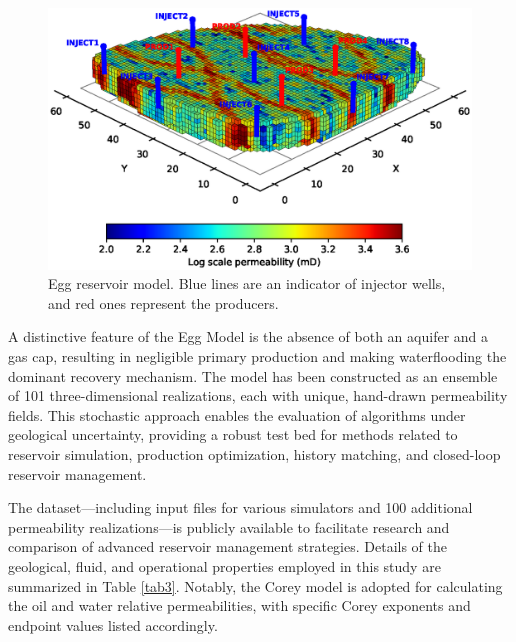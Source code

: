 \documentclass[pdflatex,sn-basic]{sn-jnl}%
\theoremstyle{thmstyleone}%
\theoremstyle{thmstyletwo}%
\theoremstyle{thmstylethree}%
\begin{document}
\begin{figure}[H]
\centering
\begin{minipage}{0.95\textwidth}
  \includegraphics[width=\textwidth]{egg_model_log_3D_well.eps}
  \caption{Egg reservoir model. Blue lines are an indicator of injector wells, and red ones represent the producers.}
  \label{fig3}
\end{minipage}
\end{figure}

A distinctive feature of the Egg Model is the absence of both an aquifer and a gas cap, resulting in negligible primary production and making waterflooding the dominant recovery mechanism. The model has been constructed as an ensemble of 101 three-dimensional realizations, each with unique, hand-drawn permeability fields. This stochastic approach enables the evaluation of algorithms under geological uncertainty, providing a robust test bed for methods related to reservoir simulation, production optimization, history matching, and closed-loop reservoir management.

The dataset—including input files for various simulators and 100 additional permeability realizations—is publicly available to facilitate research and comparison of advanced reservoir management strategies. Details of the geological, fluid, and operational properties employed in this study are summarized in Table \ref{tab3}. Notably, the Corey model is adopted for calculating the oil and water relative permeabilities, with specific Corey exponents and endpoint values listed accordingly.
\end{document}
